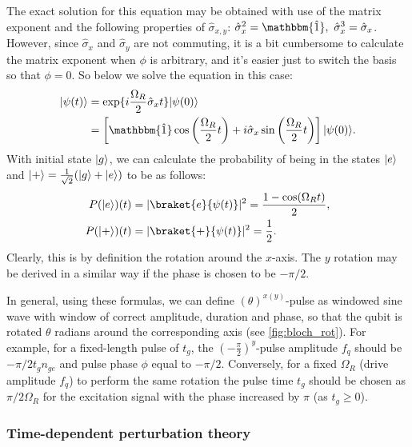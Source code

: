 \documentclass[12pt, twoside]{report}
\DeclarePairedDelimiter\ket{\lvert}{\rangle}
\numberwithin{equation}{section}
\begin{document}
The exact solution for this equation may be obtained with use of the matrix exponent and the following properties of $\hat \sigma_{x,y}$: $\hat \sigma_x^2 = \mathbbm{\hat 1},\ \hat \sigma_x^3 = \hat\sigma_x$. However, since $\hat \sigma_x$ and $\hat \sigma_y$ are not commuting, it is a bit cumbersome to calculate the matrix exponent when $\phi$ is arbitrary, and it's easier just to switch the basis so that $\phi=0$. So below we solve the equation in this case:
\begin{equation}
\begin{aligned}
\ket{\psi(t)} &= \exp\{i\frac{\Omega_R}{2}\hat \sigma_x t\} \ket{\psi(0)}\\
& = \left[\mathbbm{\hat 1} \cos\left(\frac{\Omega_R}{2}  t\right) + i\hat \sigma_x \sin\left(\frac{\Omega_R}{2} t\right)\right]\ket{\psi(0)}. 
\end{aligned}
\end{equation}
With initial state $\ket{g}$, we can calculate the probability of being in the states $\ket{e}$ and $\ket{+} = \frac{1}{\sqrt{2}}(\ket{g}+\ket{e})$ to be  as follows:
\begin{equation}
\begin{aligned}
P(\ket{e})(t) &= |\braket{e}{\psi(t)}|^2 = \frac{1-\cos(\Omega_R t)}{2},\\
P(\ket{+})(t) &= |\braket{+}{\psi(t)}|^2 = \frac{1}{2}.
\end{aligned}
\label{eq:x_rotation}
\end{equation}
Clearly, this is by definition the rotation around the $x$-axis. The $y$ rotation may be derived in a similar way if the phase is chosen to be $-\pi/2$. 

In general, using these formulas, we can define $(\theta)^{x(y)}$-pulse as windowed sine wave with window of correct amplitude, duration and phase, so that the qubit is rotated $\theta$ radians around the corresponding axis (see \autoref{fig:bloch_rot}). For example, for a fixed-length pulse of $t_g$, the $(-\frac{\pi}{2})^{y}$-pulse amplitude $f_q$ should be $- \pi/2 t_g n_{ge}$ and pulse phase $\phi$ equal to $-\pi/2$. Conversely, for a fixed $\Omega_R$ (drive amplitude $f_q$) to perform the same rotation the pulse time $t_g$ should be chosen as $\pi/2\Omega_R$ for the excitation signal with the phase increased by $\pi$ (as $t_g\geq 0$).

\subsubsection{Time-dependent perturbation theory}
\end{document}

